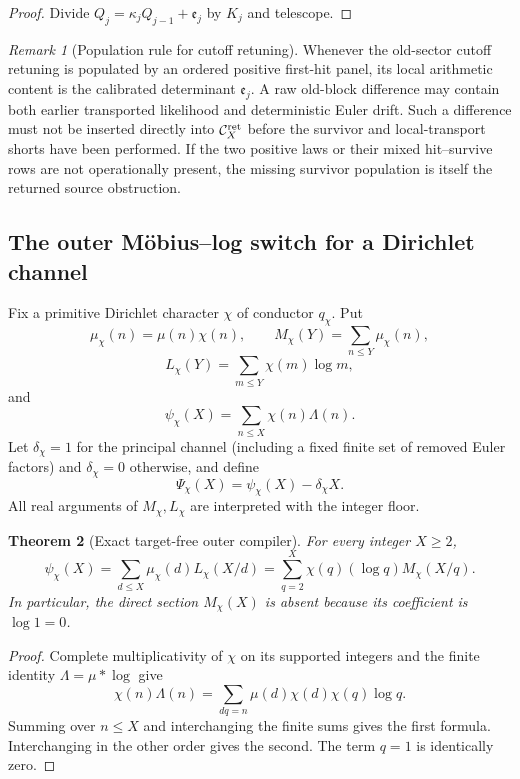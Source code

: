 \documentclass[11pt]{article}
\newtheorem{theorem}{Theorem}[section]
\theoremstyle{definition}
\theoremstyle{remark}
\newtheorem{remark}[theorem]{Remark}
\begin{document}
\begin{proof}
Divide \(Q_j=\kappa_jQ_{j-1}+\mathfrak e_j\) by \(K_j\) and telescope.
\end{proof}

\begin{remark}[Population rule for cutoff retuning]
Whenever the old-sector cutoff retuning is populated by an ordered positive
first-hit panel, its local arithmetic content is the calibrated determinant
\(\mathfrak e_j\).  A raw old-block difference may contain both earlier
transported likelihood and deterministic Euler drift.  Such a difference
must not be inserted directly into \(\mathcal C_X^{\rm ret}\) before the
survivor and local-transport shorts have been performed.  If the two positive
laws or their mixed hit--survive rows are not operationally present, the
missing survivor population is itself the returned source obstruction.
\end{remark}

\subsection{The outer M\"obius--log switch for a Dirichlet channel}
\label{subsec:grhouter-outer-switch}

Fix a primitive Dirichlet character \(\chi\) of conductor \(q_\chi\).  Put
\[
 \mu_\chi(n)=\mu(n)\chi(n),
 \qquad
 M_\chi(Y)=\sum_{n\le Y}\mu_\chi(n),
\]
\[
 L_\chi(Y)=\sum_{m\le Y}\chi(m)\log m,
\]
and
\[
 \psi_\chi(X)=\sum_{n\le X}\chi(n)\Lambda(n).
\]
Let \(\delta_\chi=1\) for the principal channel (including a fixed finite set of removed Euler factors) and
\(\delta_\chi=0\) otherwise, and define
\[
 \Psi_\chi(X)=\psi_\chi(X)-\delta_\chi X.
\]
All real arguments of \(M_\chi,L_\chi\) are interpreted with the integer
floor.

\begin{theorem}[Exact target-free outer compiler]
\label{thm:grhouter-outer-compiler}
For every integer \(X\ge2\),
\[
 \boxed{
 \psi_\chi(X)
 =\sum_{d\le X}\mu_\chi(d)L_\chi(X/d)
 =\sum_{q=2}^{X}\chi(q)(\log q)M_\chi(X/q).}
 \tag{G.10}
\]
In particular, the direct section \(M_\chi(X)\) is absent because its
coefficient is \(\log1=0\).
\end{theorem}

\begin{proof}
Complete multiplicativity of \(\chi\) on its supported integers and the
finite identity \(\Lambda=\mu*\log\) give
\[
 \chi(n)\Lambda(n)
 =\sum_{dq=n}\mu(d)\chi(d)\chi(q)\log q.
\]
Summing over \(n\le X\) and interchanging the finite sums gives the first
formula.  Interchanging in the other order gives the second.  The term
\(q=1\) is identically zero.
\end{proof}
\end{document}
